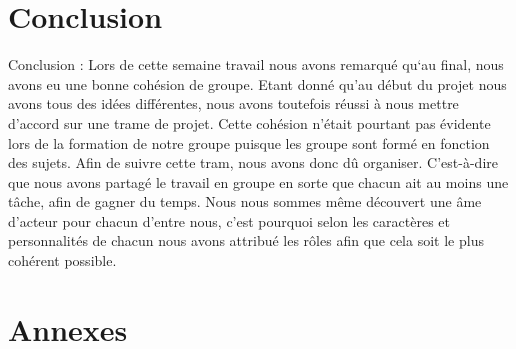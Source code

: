 \documentclass[a4paper,10pt]{article} %
\begin{document}
\section*{Conclusion}
Conclusion :
        Lors de cette semaine travail nous avons remarqué qu‘au final, nous avons eu une bonne cohésion de groupe. Etant donné qu’au début du projet nous avons tous des idées différentes, nous avons toutefois réussi à nous mettre d’accord sur une trame de projet. Cette cohésion n’était pourtant pas évidente lors de la formation de notre groupe puisque les groupe sont formé en fonction des sujets. Afin de suivre cette tram, nous avons donc dû organiser. C’est-à-dire que nous avons partagé le travail en groupe en sorte que chacun ait au moins une tâche, afin de gagner du temps. Nous nous sommes même découvert une âme d’acteur pour chacun d’entre nous, c’est pourquoi selon les caractères et personnalités de chacun nous avons attribué les rôles afin que cela soit le plus cohérent possible.
\section*{Annexes}
\end{document}
